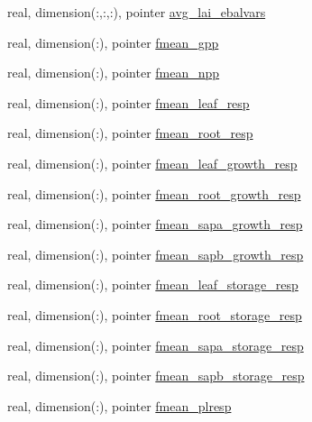\begin{DoxyCompactItemize}
\item 
real, dimension(\+:,\+:,\+:), pointer \hyperlink{structed__state__vars_1_1edtype_a7af9613eb32efaea28254c2e63dffba6}{avg\+\_\+lai\+\_\+ebalvars}
\item 
real, dimension(\+:), pointer \hyperlink{structed__state__vars_1_1edtype_a9c1f2b7ee40dcbde54d1514f5c1d1f0f}{fmean\+\_\+gpp}
\item 
real, dimension(\+:), pointer \hyperlink{structed__state__vars_1_1edtype_ab3f58dc93aa84580b1f4cdb2518ea5c6}{fmean\+\_\+npp}
\item 
real, dimension(\+:), pointer \hyperlink{structed__state__vars_1_1edtype_a4351a27b9073f87d9a4826e53f06f08a}{fmean\+\_\+leaf\+\_\+resp}
\item 
real, dimension(\+:), pointer \hyperlink{structed__state__vars_1_1edtype_a7a801621e3eceb8825350e6fc414ff44}{fmean\+\_\+root\+\_\+resp}
\item 
real, dimension(\+:), pointer \hyperlink{structed__state__vars_1_1edtype_a07142f131706cdfeea3b130b2cb00e75}{fmean\+\_\+leaf\+\_\+growth\+\_\+resp}
\item 
real, dimension(\+:), pointer \hyperlink{structed__state__vars_1_1edtype_a00033c711c3a4b9e1a2fe8a097b47859}{fmean\+\_\+root\+\_\+growth\+\_\+resp}
\item 
real, dimension(\+:), pointer \hyperlink{structed__state__vars_1_1edtype_abc1b8e060ef6e2e1dedbbe0a70141b90}{fmean\+\_\+sapa\+\_\+growth\+\_\+resp}
\item 
real, dimension(\+:), pointer \hyperlink{structed__state__vars_1_1edtype_ab2db5e085926213747fe919495254e2a}{fmean\+\_\+sapb\+\_\+growth\+\_\+resp}
\item 
real, dimension(\+:), pointer \hyperlink{structed__state__vars_1_1edtype_a8ad8f1d0109b1817358942c9f1146bab}{fmean\+\_\+leaf\+\_\+storage\+\_\+resp}
\item 
real, dimension(\+:), pointer \hyperlink{structed__state__vars_1_1edtype_a59353cbaaedd4609b8da463260a0e6c6}{fmean\+\_\+root\+\_\+storage\+\_\+resp}
\item 
real, dimension(\+:), pointer \hyperlink{structed__state__vars_1_1edtype_ac426b0d6ef627c425dee7a8bfa622aff}{fmean\+\_\+sapa\+\_\+storage\+\_\+resp}
\item 
real, dimension(\+:), pointer \hyperlink{structed__state__vars_1_1edtype_ab58a519eeaa9fe58e03c2c9733ec4119}{fmean\+\_\+sapb\+\_\+storage\+\_\+resp}
\item 
real, dimension(\+:), pointer \hyperlink{structed__state__vars_1_1edtype_a0323659bde785f906d49f05e70cfef3f}{fmean\+\_\+plresp}

\end{DoxyCompactItemize}
